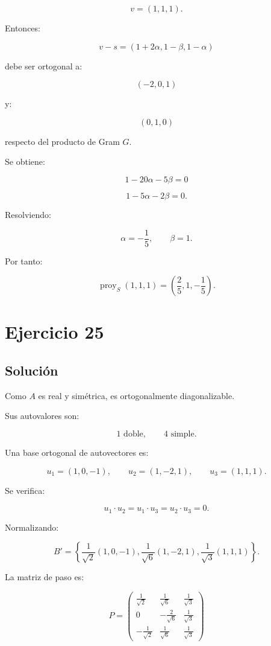 \documentclass[11pt,a4paper]{article}
\newcommand{\proy}{\operatorname{proy}}
\begin{document}
\[
v=(1,1,1).
\]

Entonces:

\[
v-s
=
(1+2\alpha,1-\beta,1-\alpha)
\]

debe ser ortogonal a:

\[
(-2,0,1)
\]

y:

\[
(0,1,0)
\]

respecto del producto de Gram $G$.

Se obtiene:

\[
1-20\alpha-5\beta=0
\]

\[
1-5\alpha-2\beta=0.
\]

Resolviendo:

\[
\alpha=-\frac15,
\qquad
\beta=1.
\]

Por tanto:

\[
\boxed{
\proy_S(1,1,1)
=
\left(
\frac25,1,-\frac15
\right).
}
\]

\section{Ejercicio 25}
\subsection{Solución}

Como $A$ es real y simétrica, es ortogonalmente diagonalizable.

Sus autovalores son:

\[
1\text{ doble},
\qquad
4\text{ simple}.
\]

Una base ortogonal de autovectores es:

\[
u_1=(1,0,-1),
\qquad
u_2=(1,-2,1),
\qquad
u_3=(1,1,1).
\]

Se verifica:

\[
u_1\cdot u_2
=
u_1\cdot u_3
=
u_2\cdot u_3
=
0.
\]

Normalizando:

\[
\boxed{
B'=
\left\{
\frac1{\sqrt2}(1,0,-1),
\frac1{\sqrt6}(1,-2,1),
\frac1{\sqrt3}(1,1,1)
\right\}.
}
\]

La matriz de paso es:

\[
\boxed{
P=
\begin{pmatrix}
\frac1{\sqrt2}&\frac1{\sqrt6}&\frac1{\sqrt3}\\
0&-\frac2{\sqrt6}&\frac1{\sqrt3}\\
-\frac1{\sqrt2}&\frac1{\sqrt6}&\frac1{\sqrt3}
\end{pmatrix}
}
\]
\end{document}
